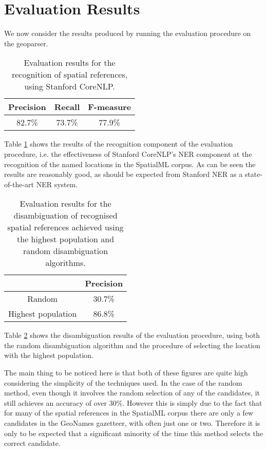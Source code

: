 \documentclass[12pt, a4paper]{report}
\begin{document}
\section{Evaluation Results}
\label{sec:evaluation_results}


We now consider the results produced by running the evaluation procedure on the geoparser. 

\begin{table}[H]
	\centering
	\begin{tabular}{| c | c | c |}
		\hline
		Precision & Recall & F-measure \\ \hline
		82.7\% & 73.7\% & 77.9\% \\ \hline
	\end{tabular}
	\caption{ Evaluation results for the recognition of spatial references, using Stanford CoreNLP. }
	\label{table:recognition}
\end{table}

Table \ref{table:recognition} shows the results of the recognition component of the evaluation procedure, i.e. the effectiveness of Stanford CoreNLP's NER component at the recognition of the named locations in the SpatialML corpus. As can be seen the results are reasonably good, as should be expected from Stanford NER as a state-of-the-art NER system.

\begin{table}[H]
	\centering
	\begin{tabular}{| c | c |}
		\hline
	    & Precision \\ \hline
		Random & 30.7\% \\ \hline
		Highest population & 86.8\% \\ \hline
	\end{tabular}
	\caption{ Evaluation results for the disambiguation of recognised spatial references achieved using the highest population and random disambiguation algorithms. }
	\label{table:disambiguation}
\end{table}

Table \ref{table:disambiguation} shows the disambiguation results of the evaluation procedure, using both the random disambiguation algorithm and the procedure of selecting the location with the highest population.

The main thing to be noticed here is that both of these figures are quite high considering the simplicity of the techniques used. In the case of the random method, even though it involves the random selection of any of the candidates, it still achieves an accuracy of over 30\%. However this is simply due to the fact that for many of the spatial references in the SpatialML corpus there are only a few candidates in the GeoNames gazetteer, with often just one or two. Therefore it is only to be expected that a significant minority of the time this method selects the correct candidate.
\end{document}
